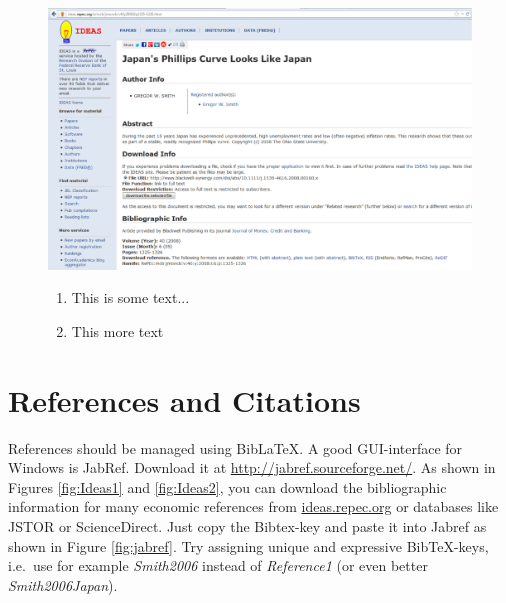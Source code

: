 \documentclass[a4paper,12pt]{scrartcl} %
\begin{document}
\begin{figure}[htbp!]
    \begin{minipage}{0.6\linewidth}
        \includegraphics[width=1.0\linewidth]{Ideas}
    \end{minipage}
    \begin{minipage}{0.3\linewidth}
        \begin{enumerate} %
            \item This is some text...
            \item This more text
        \end{enumerate}
    \end{minipage}
\end{figure}



\section{References and Citations}
References should be managed using Bib\LaTeX. A good GUI-interface for Windows is JabRef. Download it at \url{http://jabref.sourceforge.net/}. As shown in Figures \ref{fig:Ideas1} and \ref{fig:Ideas2}, you can download the bibliographic information for many economic references from \url{ideas.repec.org} or databases like JSTOR or ScienceDirect. Just copy the Bibtex-key and paste it into Jabref as shown in Figure \ref{fig:jabref}. Try assigning unique and expressive Bib\TeX-keys, i.e.\ use for example \textit{Smith2006} instead of \textit{Reference1} (or even better \textit{Smith2006Japan}).
\end{document}
